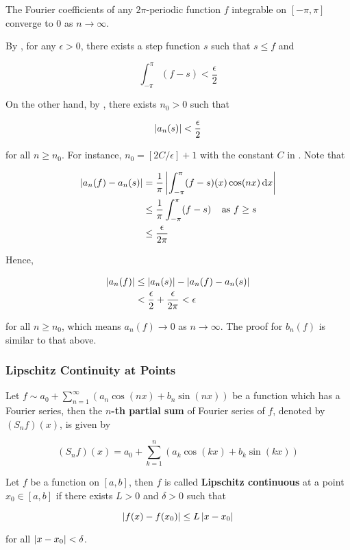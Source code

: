 \documentclass[a4paper,12pt]{article}
\begin{document}
\begin{thm}
  The Fourier coefficients of any $2\pi$-periodic function $f$ integrable on $[-\pi,\pi]$ converge to $0$ as $n\to\infty$.\n

  \prf By \rpst[\sctd{1}], for any $\epsilon>0$, there exists a step function $s$ such that $s\leq f$ and

  $$\int_{-\pi}^{\pi}(f-s)<\frac{\epsilon}{2}$$\s

  On the other hand, by \rpst[\sctd{2}], there exists $n_{0}>0$ such that

  $$\left| a_{n}(s)\right|<\frac{\epsilon}{2}$$\s

  for all $n\geq n_{0}$. For instance, $n_{0}=[2C/\epsilon]+1$ with the constant $C$ in \rpst[\sctd{2}]. Note that

  $$\begin{aligned}[t]
    \left| a_{n}(f)-a_{n}(s)\right|&=\frac{1}{\pi}\left| \int_{-\pi}^{\pi}(f-s)(x)\cos(nx)\,\mathrm{d} x\right|\\
    &\leq\frac{1}{\pi}\int_{-\pi}^{\pi}(f-s)\;\;\;\;\text{as }f\geq s\\
    &\leq\frac{\epsilon}{2\pi}
  \end{aligned}$$\s

  Hence,

  $$\begin{aligned}[t]
    \left| a_{n}(f)\right|&\leq\left| a_{n}(s)\right|-\left| a_{n}(f)-a_{n}(s)\right|\\
    &<\frac{\epsilon}{2}+\frac{\epsilon}{2\pi}<\epsilon
  \end{aligned}$$\s

  for all $n\geq n_{0}$, which means $a_{n}(f)\to 0$ as $n\to\infty$. The proof for $b_{n}(f)$ is similar to that above.
\end{thm}

\subsubsection{Lipschitz Continuity at Points}
\begin{dft}
  Let $f\sim a_{0}+\sum_{n=1}^{\infty}(a_{n}\cos(nx)+b_{n}\sin(nx))$ be a function which has a Fourier series, then the \textbf{$n$-th partial sum} of Fourier series of $f$, denoted by $(S_{n}f)(x)$, is given by

  $$(S_{n}f)(x)=a_{0}+\sum_{k=1}^{n}(a_{k}\cos(kx)+b_{k}\sin(kx))$$
\end{dft}\n

\begin{dft}
  Let $f$ be a function on $[a,b]$, then $f$ is called \textbf{Lipschitz continuous} at a point $x_{0}\in[a,b]$ if there exists $L>0$ and $\delta>0$ such that

  $$\left| f(x)-f(x_{0})\right|\leq L\left| x-x_{0}\right|$$\s

  for all $\left| x-x_{0}\right|<\delta$.
\end{dft}\n
\end{document}
